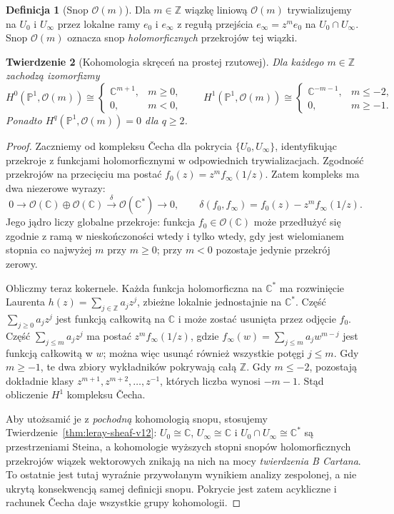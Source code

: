\documentclass[11pt,a4paper,oneside]{report}
\newcommand{\C}{\mathbb{C}}
\newcommand{\Z}{\mathbb{Z}}
\theoremstyle{plain}
\newtheorem{twierdzenie}{Twierdzenie}[section]
\theoremstyle{definition}
\newtheorem{definicja}[twierdzenie]{Definicja}
\theoremstyle{remark}
\begin{document}
\begin{definicja}[Snop $\mathcal O(m)$]
Dla $m\in\Z$ wiązkę liniową $\mathcal O(m)$
trywializujemy na $U_0$ i $U_\infty$ przez
lokalne ramy $e_0$ i $e_\infty$ z regułą przejścia
$e_\infty=z^m e_0$ na $U_0\cap U_\infty$.
Snop $\mathcal O(m)$ oznacza snop \emph{holomorficznych}
przekrojów tej wiązki.
\end{definicja}

\begin{twierdzenie}[Kohomologia skręceń na prostej rzutowej]
\label{thm:p1-twist-v12}
Dla każdego $m\in\Z$ zachodzą izomorfizmy
\[
H^0(\mathbb P^1,\mathcal O(m))\cong
\begin{cases}\C^{m+1},&m\ge0,\\0,&m<0,\end{cases}
\qquad
H^1(\mathbb P^1,\mathcal O(m))\cong
\begin{cases}\C^{-m-1},&m\le-2,\\0,&m\ge-1.\end{cases}
\]
Ponadto $H^q(\mathbb P^1,\mathcal O(m))=0$ dla $q\ge2$.
\end{twierdzenie}
\begin{proof}
Zaczniemy od kompleksu \v{C}echa dla pokrycia
$\{U_0,U_\infty\}$, identyfikując przekroje z funkcjami
holomorficznymi w odpowiednich trywializacjach.
Zgodność przekrojów na przecięciu ma postać
$f_0(z)=z^m f_\infty(1/z)$.
Zatem kompleks ma dwa niezerowe wyrazy:
\[
0\longrightarrow
\mathcal O(\C)\oplus\mathcal O(\C)
\xrightarrow{\,\delta\,}\mathcal O(\C^*)
\longrightarrow0,
\qquad
\delta(f_0,f_\infty)=f_0(z)-z^m f_\infty(1/z).
\]
Jego jądro liczy globalne przekroje: funkcja
$f_0\in\mathcal O(\C)$ może przedłużyć się zgodnie
z ramą w nieskończoności wtedy i tylko wtedy,
gdy jest wielomianem stopnia co najwyżej $m$ przy $m\ge0$;
przy $m<0$ pozostaje jedynie przekrój zerowy.

Obliczmy teraz kokernele. Każda funkcja holomorficzna
na $\C^*$ ma rozwinięcie Laurenta
$h(z)=\sum_{j\in\Z}a_jz^j$, zbieżne lokalnie jednostajnie
na $\C^*$. Część $\sum_{j\ge0}a_jz^j$ jest funkcją
całkowitą na $\C$ i może zostać usunięta przez
odjęcie $f_0$. Część $\sum_{j\le m}a_jz^j$
ma postać $z^m f_\infty(1/z)$, gdzie
$f_\infty(w)=\sum_{j\le m}a_jw^{m-j}$ jest
funkcją całkowitą w $w$; można więc usunąć również
wszystkie potęgi $j\le m$. Gdy $m\ge-1$, te dwa
zbiory wykładników pokrywają całą $\Z$.
Gdy $m\le-2$, pozostają dokładnie klasy
$z^{m+1},z^{m+2},\ldots,z^{-1}$, których liczba wynosi
$-m-1$. Stąd obliczenie $H^1$ kompleksu \v{C}echa.

Aby utożsamić je z \emph{pochodną} kohomologią snopu,
stosujemy Twierdzenie~\ref{thm:leray-sheaf-v12}:
$U_0\cong\C$, $U_\infty\cong\C$ i
$U_0\cap U_\infty\cong\C^*$ są przestrzeniami Steina,
a kohomologie wyższych stopni snopów holomorficznych
przekrojów wiązek wektorowych znikają na nich
na mocy \emph{twierdzenia B Cartana}. To ostatnie
jest tutaj wyraźnie przywołanym wynikiem analizy
zespolonej, a nie ukrytą konsekwencją samej definicji
snopu. Pokrycie jest zatem acykliczne i rachunek
\v{C}echa daje wszystkie grupy kohomologii.
\end{proof}
\end{document}
